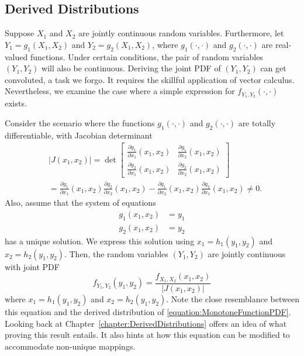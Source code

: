 \subsection{Derived Distributions}

Suppose $X_1$ and $X_2$ are jointly continuous random variables.
Furthermore, let $Y_1 = g_1 (X_1, X_2)$ and $Y_2 = g_2 (X_1, X_2)$, where $g_1 (\cdot, \cdot)$ and $g_2 (\cdot, \cdot)$ are real-valued functions.
Under certain conditions, the pair of random variables $(Y_1, Y_2)$ will also be continuous.
Deriving the joint PDF of $(Y_1, Y_2)$ can get convoluted, a task we forgo.
It requires the skillful application of vector calculus.
Nevertheless, we examine the case where a simple expression for $f_{Y_1, Y_2} (\cdot, \cdot)$ exists.

Consider the scenario where the functions $g_1 (\cdot, \cdot)$ and $g_2 (\cdot, \cdot)$ are totally differentiable, with Jacobian determinant
\begin{equation*}
\begin{split}
&|J(x_1, x_2)| = \operatorname{det} \begin{bmatrix}
\frac{\partial g_1}{\partial x_1} (x_1, x_2) &
\frac{\partial g_1}{\partial x_2} (x_1, x_2) \\
\frac{\partial g_2}{\partial x_1} (x_1, x_2) &
\frac{\partial g_2}{\partial x_2} (x_1, x_2)
\end{bmatrix} \\
&= \frac{\partial g_1}{\partial x_1} (x_1, x_2)
\frac{\partial g_2}{\partial x_2} (x_1, x_2)
- \frac{\partial g_1}{\partial x_2} (x_1, x_2)
\frac{\partial g_2}{\partial x_1} (x_1, x_2)
\neq 0 .
\end{split}
\end{equation*}
Also, assume that the system of equations
\begin{align*}
g_1 (x_1, x_2) &= y_1 \\
g_2 (x_1, x_2) &= y_2
\end{align*}
has a unique solution.
We express this solution using $x_1 = h_1 (y_1, y_2)$ and $x_2 = h_2 (y_1, y_2)$.
Then, the random variables $(Y_1, Y_2)$ are jointly continuous with joint PDF
\begin{equation} \label{equation:DerivedJointPDF}
f_{Y_1, Y_2} (y_1, y_2) =
\frac{f_{X_1, X_2} (x_1, x_2)}{ | J(x_1, x_2) |}
\end{equation}
where $x_1 = h_1 (y_1, y_2)$ and $x_2 = h_2 (y_1, y_2)$.
Note the close resemblance between this equation and the derived distribution of \eqref{equation:MonotoneFunctionPDF}.
Looking back at Chapter~\ref{chapter:DerivedDistributions} offers an idea of what proving this result entails.
It also hints at how this equation can be modified to accommodate non-unique mappings.


